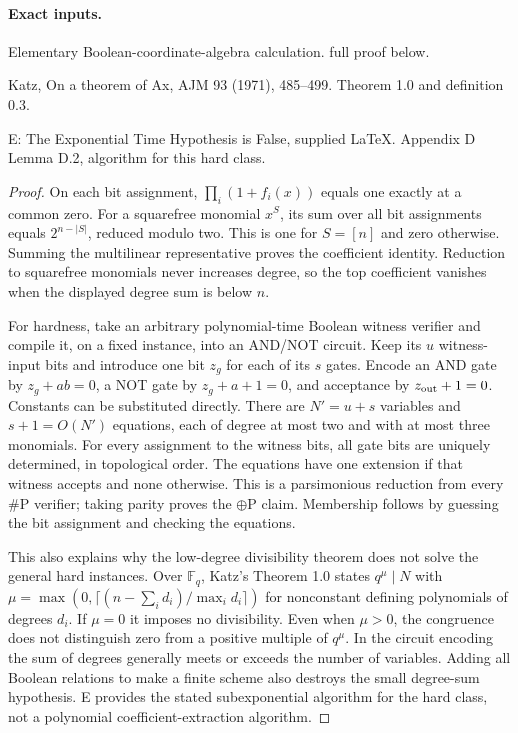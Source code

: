 \paragraph{Exact inputs.}
Elementary Boolean-coordinate-algebra calculation. full proof below.

Katz, On a theorem of Ax, AJM 93 (1971), 485--499. Theorem 1.0 and definition 0.3.

E: The Exponential Time Hypothesis is False, supplied LaTeX. Appendix D Lemma D.2, algorithm for this hard class.

\begin{proof}
On each bit assignment, $\prod_i(1+f_i(x))$ equals one exactly at a common zero. For a squarefree monomial $x^S$, its sum over all bit assignments equals $2^{n-|S|}$, reduced modulo two. This is one for $S=[n]$ and zero otherwise. Summing the multilinear representative proves the coefficient identity. Reduction to squarefree monomials never increases degree, so the top coefficient vanishes when the displayed degree sum is below $n$.

For hardness, take an arbitrary polynomial-time Boolean witness verifier and compile it, on a fixed instance, into an AND/NOT circuit. Keep its $u$ witness-input bits and introduce one bit $z_g$ for each of its $s$ gates. Encode an AND gate by $z_g+ab=0$, a NOT gate by $z_g+a+1=0$, and acceptance by $z_{\rm out}+1=0$. Constants can be substituted directly. There are $N'=u+s$ variables and $s+1=O(N')$ equations, each of degree at most two and with at most three monomials. For every assignment to the witness bits, all gate bits are uniquely determined, in topological order. The equations have one extension if that witness accepts and none otherwise. This is a parsimonious reduction from every $\#\mathrm P$ verifier; taking parity proves the $\oplus\mathrm P$ claim. Membership follows by guessing the bit assignment and checking the equations.

This also explains why the low-degree divisibility theorem does not solve the general hard instances. Over $\mathbb F_q$, Katz's Theorem 1.0 states $q^\mu\mid N$ with $\mu=\max(0,\lceil(n-\sum_i d_i)/\max_i d_i\rceil)$ for nonconstant defining polynomials of degrees $d_i$. If $\mu=0$ it imposes no divisibility. Even when $\mu>0$, the congruence does not distinguish zero from a positive multiple of $q^\mu$. In the circuit encoding the sum of degrees generally meets or exceeds the number of variables. Adding all Boolean relations to make a finite scheme also destroys the small degree-sum hypothesis. E provides the stated subexponential algorithm for the hard class, not a polynomial coefficient-extraction algorithm.
\end{proof}
